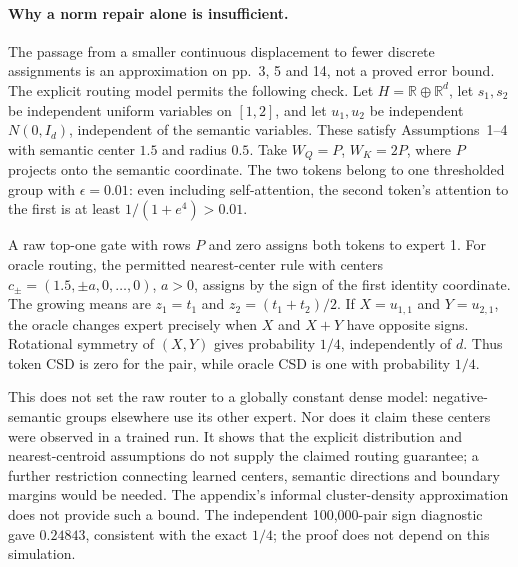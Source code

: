 \documentclass[10pt]{article}
\begin{document}
\paragraph*{Why a norm repair alone is insufficient.}\mbox{}\par
The passage from a smaller continuous displacement to fewer discrete assignments is an approximation on pp. 3, 5 and 14, not a proved error bound. The explicit routing model permits the following check. Let \(H=\mathbb R\oplus\mathbb R^d\), let \(s_1,s_2\) be independent uniform variables on \([1,2]\), and let \(u_1,u_2\) be independent \(N(0,I_d)\), independent of the semantic variables. These satisfy Assumptions 1–4 with semantic center \(1.5\) and radius \(0.5\). Take \(W_Q=P\), \(W_K=2P\), where \(P\) projects onto the semantic coordinate. The two tokens belong to one thresholded group with \(\epsilon=0.01\): even including self-attention, the second token’s attention to the first is at least \(1/(1+e^4)>0.01\).\par
A raw top-one gate with rows \(P\) and zero assigns both tokens to expert 1. For oracle routing, the permitted nearest-center rule with centers \(c_\pm=(1.5,\pm a,0,\ldots,0)\), \(a>0\), assigns by the sign of the first identity coordinate. The growing means are \(z_1=t_1\) and \(z_2=(t_1+t_2)/2\). If \(X=u_{1,1}\) and \(Y=u_{2,1}\), the oracle changes expert precisely when \(X\) and \(X+Y\) have opposite signs. Rotational symmetry of \((X,Y)\) gives probability \(1/4\), independently of \(d\). Thus token CSD is zero for the pair, while oracle CSD is one with probability \(1/4\).\par
This does not set the raw router to a globally constant dense model: negative-semantic groups elsewhere use its other expert. Nor does it claim these centers were observed in a trained run. It shows that the explicit distribution and nearest-centroid assumptions do not supply the claimed routing guarantee; a further restriction connecting learned centers, semantic directions and boundary margins would be needed. The appendix’s informal cluster-density approximation does not provide such a bound. The independent 100,000-pair sign diagnostic gave \(0.24843\), consistent with the exact \(1/4\); the proof does not depend on this simulation.\par
\end{document}
